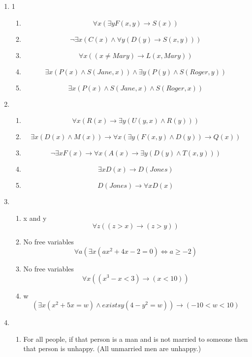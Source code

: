 \begin{enumerate}
    \item 1
    \begin{enumerate}
        \item 
            \[\forall x (\exists y F(x, y) \rightarrow S(x))\]
        \item 
            \[\lnot \exists x (C(x) \land  \forall y (D(y) \rightarrow S(x, y)))\]
        \item 
            \[\forall x ((x \neq Mary) \rightarrow L(x, Mary))\]
        \item 
            \[\exists x (P(x) \land S(Jane, x)) \land \exists y (P(y) \land S(Roger, y))\]
        \item 
            \[\exists x (P(x) \land S(Jane, x) \land S(Roger, x))\]
    \end{enumerate}
    \item
    \begin{enumerate}
        \item 
            \[\forall x (R(x) \rightarrow \exists y (U(y, x) \land R(y)))\]
        \item 
            \[\exists x (D(x) \land M(x)) \rightarrow \forall x (\exists y (F(x,y) \land D(y)) \rightarrow Q(x))\]
        \item 
            \[\lnot \exists x F(x) \rightarrow \forall x (A(x) \rightarrow \exists y (D(y) \land T(x, y)))\]
        \item 
            \[\exists x D(x) \rightarrow D(Jones)\]
        \item 
            \[D(Jones) \rightarrow \forall x D(x)\]
    \end{enumerate}
    \item 
    \begin{enumerate}
        \item x and y
        \[\forall z ((z>x) \rightarrow (z>y)) \]
        \item No free variables
        \[\forall a (\exists x (ax^2 + 4x - 2 = 0) \iff a \geq -2)\]
        \item No free variables
        \[\forall x ((x^3 -x < 3) \rightarrow (x < 10))\]
        \item w
        \[(\exists x (x^2 + 5x = w) \land exists y (4-y^2=w)) \rightarrow (-10 < w < 10)\]
    \end{enumerate}
    \item
    \begin{enumerate}
        \item For all people, if that person is a man and is not married to someone then that person is unhappy. (All unmarried men are unhappy.)

\end{enumerate}
\end{enumerate}
